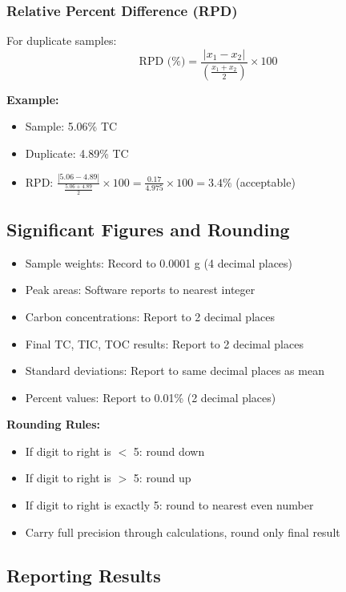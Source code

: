 \documentclass[11pt,a4paper]{article}\usepackage[]{graphicx}\usepackage[]{xcolor}
\begin{document}
\subsubsection{Relative Percent Difference (RPD)}
For duplicate samples:
\begin{equation}
\text{RPD (\%)} = \frac{|x_1 - x_2|}{\left(\frac{x_1 + x_2}{2}\right)} \times 100
\end{equation}

\textbf{Example:}
\begin{itemize}[noitemsep]
    \item Sample: 5.06\% TC
    \item Duplicate: 4.89\% TC
    \item RPD: $\frac{|5.06 - 4.89|}{\frac{5.06 + 4.89}{2}} \times 100 = \frac{0.17}{4.975} \times 100 = 3.4\%$ (acceptable)
\end{itemize}

\subsection{Significant Figures and Rounding}

\begin{itemize}[noitemsep]
    \item Sample weights: Record to 0.0001 g (4 decimal places)
    \item Peak areas: Software reports to nearest integer
    \item Carbon concentrations: Report to 2 decimal places
    \item Final TC, TIC, TOC results: Report to 2 decimal places
    \item Standard deviations: Report to same decimal places as mean
    \item Percent values: Report to 0.01\% (2 decimal places)
\end{itemize}

\textbf{Rounding Rules:}
\begin{itemize}[noitemsep]
    \item If digit to right is $<$ 5: round down
    \item If digit to right is $>$ 5: round up
    \item If digit to right is exactly 5: round to nearest even number
    \item Carry full precision through calculations, round only final result
\end{itemize}

\subsection{Reporting Results}
\end{document}
